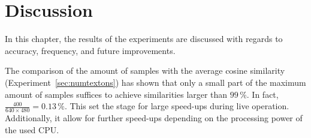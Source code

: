 \chapter{Discussion}
\label{chap:discussion}

In this chapter, the results of the experiments are discussed with regards to accuracy, frequency, and future improvements.

The comparison of the amount of samples with the average cosine
similarity (Experiment~\ref{sec:numtextons}) has shown that only a small part of the maximum amount of
samples suffices to achieve similarities larger than $99\,\%$. In
fact, $\frac{400}{640 \times 480} = 0.13\,\%$. This set the stage for
large speed-ups during live operation. Additionally, it allow for further speed-ups depending on the processing power of the used
CPU.
